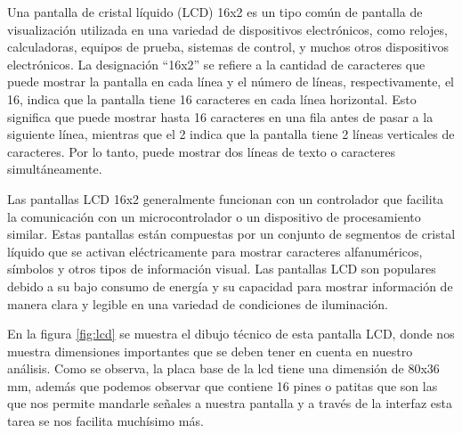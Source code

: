 Una pantalla de cristal líquido (LCD) 16x2 es un tipo común de pantalla de visualización utilizada en una variedad de dispositivos electrónicos, como relojes, calculadoras, equipos de prueba, sistemas de control, y muchos otros dispositivos electrónicos. La designación “16x2” se refiere a la cantidad de caracteres que puede mostrar la pantalla en cada línea y el número de líneas, respectivamente, el 16, indica que la pantalla tiene 16 caracteres en cada línea horizontal. Esto significa que puede mostrar hasta 16 caracteres en una fila antes de pasar a la siguiente línea, mientras que el 2 indica que la pantalla tiene 2 líneas verticales de caracteres. Por lo tanto, puede mostrar dos líneas de texto o caracteres simultáneamente.

Las pantallas LCD 16x2 generalmente funcionan con un controlador que facilita la comunicación con un microcontrolador o un dispositivo de procesamiento similar. Estas pantallas están compuestas por un conjunto de segmentos de cristal líquido que se activan eléctricamente para mostrar caracteres alfanuméricos, símbolos y otros tipos de información visual. Las pantallas LCD son populares debido a su bajo consumo de energía y su capacidad para mostrar información de manera clara y legible en una variedad de condiciones de iluminación.

En la figura \ref{fig:lcd} se muestra el dibujo técnico de esta pantalla LCD, donde nos muestra dimensiones importantes que se deben tener en cuenta en nuestro análisis. Como se observa, la placa base de la lcd tiene una dimensión de 80x36 mm, además que podemos observar que contiene 16 pines o patitas que son las que nos permite mandarle señales a nuestra pantalla y a través de la interfaz esta tarea se nos facilita muchísimo más.

